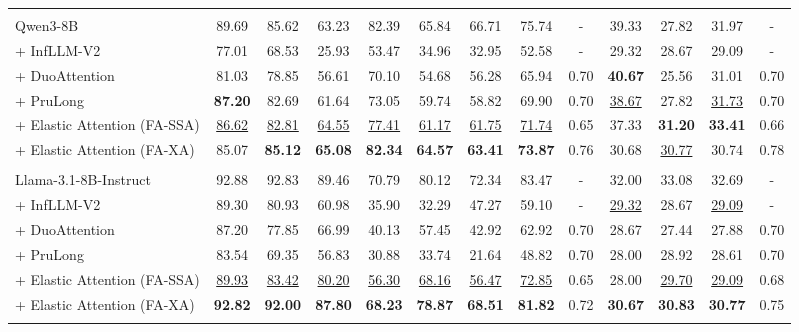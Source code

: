 \begin{table}[t]
{\begin{tabular}{l | c c c c c c | c | c | c c | c | c}
\arrayrulecolor{black}\midrule
\rowcolor{blue!25}
\multicolumn{13}{c}{\textbf{Qwen3-8B 骨干模型}} \\
\arrayrulecolor{black!20}\midrule
Qwen3-8B & 89.69 & 85.62 & 63.23 & 82.39 & 65.84 & 66.71 & 75.74 & - & 39.33 & 27.82 & 31.97 & - \\
+ InfLLM-V2 & 77.01 & 68.53 & 25.93 & 53.47 & 34.96 & 32.95 & 52.58 & - & 29.32 & 28.67 & 29.09 & -\\
+ DuoAttention & 81.03 & 78.85 & 56.61 & 70.10 & 54.68 & 56.28 & 65.94 & 0.70 & \textbf{40.67} & 25.56 & 31.01 & 0.70\\
+ PruLong & \textbf{87.20} & 82.69 & 61.64 & 73.05 & 59.74 & 58.82 & 69.90 & 0.70 & \underline{38.67} & 27.82 & \underline{31.73} & 0.70\\
\arrayrulecolor{black!40}\midrule
+ Elastic Attention (FA-SSA) & \underline{86.62} & \underline{82.81} & \underline{64.55} & \underline{77.41} & \underline{61.17} & \underline{61.75} & \underline{71.74} & 0.65 & 37.33 & \textbf{31.20} & \textbf{33.41} & 0.66\\
+ Elastic Attention (FA-XA) & 85.07 & \textbf{85.12} & \textbf{65.08} & \textbf{82.34} & \textbf{64.57} & \textbf{63.41} & \textbf{73.87} & 0.76 & 30.68 & \underline{30.77} & 30.74 & 0.78\\

\arrayrulecolor{black}\midrule
\rowcolor{cyan!20}
\multicolumn{13}{c}{\textbf{Llama-3.1-8B-Instruct 骨干模型}} \\
\arrayrulecolor{black!20}\midrule
Llama-3.1-8B-Instruct & 92.88 & 92.83 & 89.46 & 70.79 & 80.12 & 72.34 & 83.47 & - & 32.00 & 33.08 & 32.69 & - \\
+ InfLLM-V2 & 89.30 & 80.93 & 60.98 & 35.90 & 32.29 & 47.27 & 59.10 & - & \underline{29.32} & 28.67 & \underline{29.09} & - \\
+ DuoAttention & 87.20 & 77.85 & 66.99 & 40.13 & 57.45 & 42.92 & 62.92 & 0.70 & 28.67 & 27.44 & 27.88 & 0.70 \\
+ PruLong & 83.54 & 69.35 & 56.83 & 30.88 & 33.74 & 21.64 & 48.82 & 0.70 & 28.00 & 28.92 & 28.61 & 0.70\\
\arrayrulecolor{black!40}\midrule
+ Elastic Attention (FA-SSA) & \underline{89.93} & \underline{83.42} & \underline{80.20} & \underline{56.30} & \underline{68.16} & \underline{56.47} & \underline{72.85} & 0.65 & 28.00 & \underline{29.70} & \underline{29.09} & 0.68\\
+ Elastic Attention (FA-XA) & \textbf{92.82} & \textbf{92.00} & \textbf{87.80} & \textbf{68.23} & \textbf{78.87} & \textbf{68.51} & \textbf{81.82} & 0.72 & \textbf{30.67} & \textbf{30.83} & \textbf{30.77} & 0.75 \\
\arrayrulecolor{black}\bottomrule
\end{tabular}
}
\vspace{-0.5em}
\label{tab:ruler_lb2_result}
\end{table}
